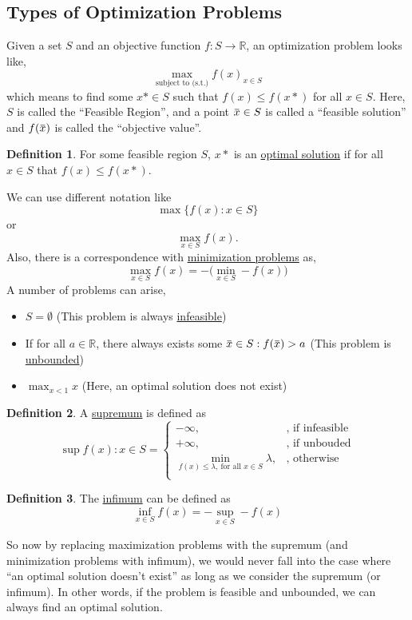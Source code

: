 \documentclass[11pt]{article}
\theoremstyle{definition}
\newtheorem{definition}{Definition}[subsection]
\theoremstyle{definition}
\theoremstyle{definition}
\theoremstyle{remark}
\renewcommand{\bar}[1]{\mkern 1.5mu\overline{\mkern-1.5mu#1\mkern-1.5mu}\mkern 1.5mu}
\newcommand{\R}{\mathbb{R}}
\begin{document}
\subsection{Types of Optimization Problems}
Given a set $S$ and an objective function $f: S \to \R$, an optimization problem
looks like,
\begin{equation*}
\max_{\text{subject to (s.t.)}} f(x)_{x \in S}
\end{equation*}
which means to find some $x* \in S$ such that $f(x) \leq f(x*)$ for all $x \in
S$. Here, $S$ is called the ``Feasible Region'', and a point $\bar x \in S$ is
called a ``feasible solution'' and $f(\bar x)$ is called the ``objective
value''.
\begin{definition}
For some feasible region $S$, $x*$ is an \underline{optimal solution} if for all
$x \in S$ that $f(x) \leq f(x*)$.
\end{definition}
We can use different notation like
\begin{equation*}
\max \{f(x) : x\in S \}
\end{equation*}
or
\begin{equation*}
\max_{x \in S} f(x).
\end{equation*}
Also, there is a correspondence with \underline{minimization problems} as,
\begin{equation*}
\max_{x \in S} f(x) = -\bigg( \min_{x \in S} -f(x) \bigg) 
\end{equation*}
A number of problems can arise,
\begin{itemize}
\item $S = \emptyset$ (This problem is always \underline{infeasible})
\item If for all $a \in \R$, there always exists some $\bar x \in S: f(\bar x)
> a$ (This problem is \underline{unbounded})
\item $\max_{x < 1} x$ (Here, an optimal solution does not exist)
\end{itemize}
\begin{definition}
A \underline{supremum} is defined as \begin{equation*}
\sup{f(x):x \in S} =
\begin{cases}
- \infty,& \text{, if infeasible}\\
+ \infty,& \text{, if unbouded}\\
\min_{f(x) \leq \lambda,\>\text{for all } x \in S}\lambda, &\text{, otherwise}\\
\end{cases}
\end{equation*}
\end{definition}
\begin{definition}
The \underline{infimum} can be defined as
\begin{equation*}
\inf_{x \in S} f(x) = - \sup_{x \in S} -f(x)
\end{equation*}
\end{definition}
So now by replacing maximization problems with the supremum (and minimization
problems with infimum), we would never fall into the case where ``an optimal
solution doesn't exist'' as long as we consider the supremum (or infimum). In
other words, if the problem is feasible and unbounded, we can always find an
optimal solution.
\end{document}
